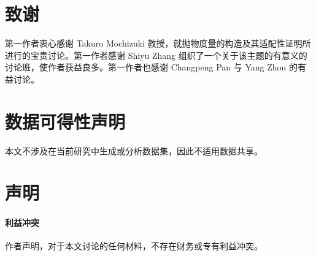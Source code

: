 \documentclass[12pt,a4paper]{article}
\begin{document}
\section*{致谢}

第一作者衷心感谢 Takuro Mochizuki 教授，就抛物度量的构造及其适配性证明所进行的宝贵讨论。第一作者感谢 Shiyu Zhang 组织了一个关于该主题的有意义的讨论班，使作者获益良多。第一作者也感谢 Changpeng Pan 与 Yang Zhou 的有益讨论。

\section*{数据可得性声明}

本文不涉及在当前研究中生成或分析数据集，因此不适用数据共享。

\section*{声明}

\paragraph{利益冲突}
作者声明，对于本文讨论的任何材料，不存在财务或专有利益冲突。
\end{document}

